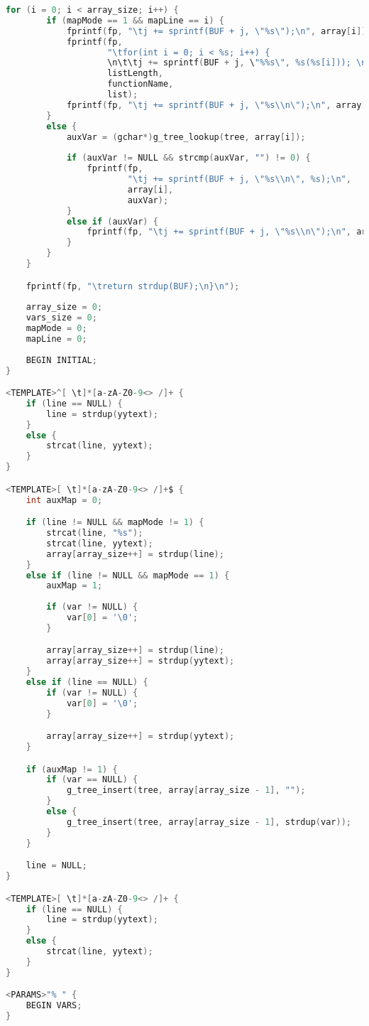 \documentclass{article}
\begin{document}
\begin{lstlisting}[language=C]
	for (i = 0; i < array_size; i++) {
		if (mapMode == 1 && mapLine == i) {
			fprintf(fp, "\tj += sprintf(BUF + j, \"%s\");\n", array[i]);
			fprintf(fp,
                    "\tfor(int i = 0; i < %s; i++) {
                    \n\t\tj += sprintf(BUF + j, \"%%s\", %s(%s[i])); \n\t}\n",
                    listLength,
                    functionName,
                    list);  
			fprintf(fp, "\tj += sprintf(BUF + j, \"%s\\n\");\n", array[i + 1]);
		}
		else {
			auxVar = (gchar*)g_tree_lookup(tree, array[i]);
		
			if (auxVar != NULL && strcmp(auxVar, "") != 0) {
				fprintf(fp, 
                        "\tj += sprintf(BUF + j, \"%s\\n\", %s);\n",
                        array[i],
                        auxVar);
			}
			else if (auxVar) {
				fprintf(fp, "\tj += sprintf(BUF + j, \"%s\\n\");\n", array[i]);
			}
		}
	}

	fprintf(fp, "\treturn strdup(BUF);\n}\n");
	
	array_size = 0;
	vars_size = 0;
	mapMode = 0;
	mapLine = 0;
	
	BEGIN INITIAL;
}

<TEMPLATE>^[ \t]*[a-zA-Z0-9<> /]+ {
	if (line == NULL) {
		line = strdup(yytext);
	}
	else {
		strcat(line, yytext);
	}
}

<TEMPLATE>[ \t]*[a-zA-Z0-9<> /]+$ {
	int auxMap = 0;

	if (line != NULL && mapMode != 1) {
		strcat(line, "%s");
		strcat(line, yytext);
		array[array_size++] = strdup(line);
	}
	else if (line != NULL && mapMode == 1) {
		auxMap = 1;
		
		if (var != NULL) {
			var[0] = '\0';
		}

		array[array_size++] = strdup(line);
		array[array_size++] = strdup(yytext);
	}
	else if (line == NULL) {
		if (var != NULL) {
			var[0] = '\0';
		}

		array[array_size++] = strdup(yytext);
	}	

	if (auxMap != 1) {
		if (var == NULL) {
			g_tree_insert(tree, array[array_size - 1], "");
		}
		else {
			g_tree_insert(tree, array[array_size - 1], strdup(var));
		}
	}

	line = NULL;
}

<TEMPLATE>[ \t]*[a-zA-Z0-9<> /]+ {
	if (line == NULL) {
		line = strdup(yytext);
	}
	else {
		strcat(line, yytext);
	}
}

<PARAMS>"% " {
	BEGIN VARS;
} 


\end{lstlisting}
\end{document}
